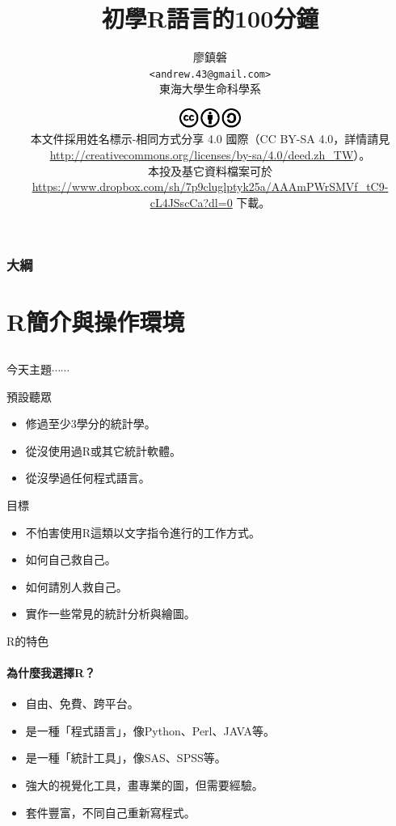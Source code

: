 \documentclass[12pt, aspectratio=43]{beamer}
\title[初學者學習R語言]{初學R語言的100分鐘}
\author[廖鎮磐]{廖鎮磐 \\ \texttt{<andrew.43@gmail.com>}\\ 東海大學生命科學系}
\institute{\normalsize 2015年台灣生態研究網年會 \\ \footnotesize 2015年3月14日於蓮華池研究中心}
\date{\footnotesize \includegraphics[width=2cm]{cc.pdf}\\
本文件採用姓名標示-相同方式分享 4.0 國際（CC BY-SA 4.0，詳情請見 \url{http://creativecommons.org/licenses/by-sa/4.0/deed.zh_TW}）。\\ 本投及基它資料檔案可於 \url{https://www.dropbox.com/sh/7p9cluglptyk25a/AAAmPWrSMVf_tC9-cL4JSscCa?dl=0} 下載。}
\begin{document}
\begin{frame}
\titlepage
\end{frame}

\begin{frame}
\frametitle{大綱}
\tableofcontents
\end{frame}

\section{R簡介與操作環境}\subsection{}

\begin{frame}{今天主題$\cdots\cdots$}

\begin{block}{預設聽眾}
\begin{itemize}
\item 修過至少3學分的統計學。
\item 從沒使用過R或其它統計軟體。
\item 從沒學過任何程式語言。
\end{itemize}
\end{block}

\begin{block}{目標}
\begin{itemize}
\item 不怕害使用R這類以文字指令進行的工作方式。
\item 如何自己救自己。
\item 如何請別人救自己。
\item 實作一些常見的統計分析與繪圖。
\end{itemize}
\end{block}

\end{frame}




\begin{frame}{R的特色}
\framesubtitle{為什麼我選擇R？}
\begin{itemize}
\item 自由、免費、跨平台。
\item 是一種「程式語言」，像Python、Perl、JAVA等。
\item 是一種「統計工具」，像SAS、SPSS等。
\item 強大的視覺化工具，畫專業的圖，但需要經驗。
\item 套件豐富，不同自己重新寫程式。
\end{itemize}
\end{frame}
\end{document}
